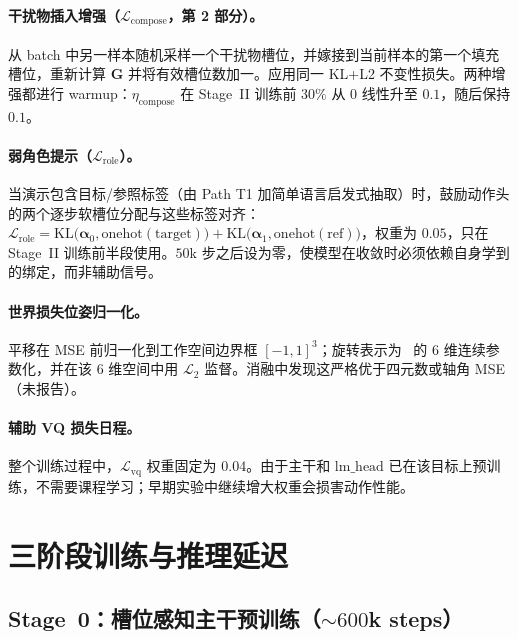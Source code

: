 \paragraph{干扰物插入增强（$\mathcal{L}_\mathrm{compose}$，第 2 部分）。}
从 batch 中另一样本随机采样一个干扰物槽位，并嫁接到当前样本的第一个填充槽位，重新计算 $\mathbf{G}$ 并将有效槽位数加一。应用同一 KL+L2 不变性损失。两种增强都进行 warmup：$\eta_\mathrm{compose}$ 在 Stage~II 训练前 $30\%$ 从 $0$ 线性升至 $0.1$，随后保持 $0.1$。

\paragraph{弱角色提示（$\mathcal{L}_\mathrm{role}$）。}
当演示包含目标/参照标签（由 Path T1 加简单语言启发式抽取）时，鼓励动作头的两个逐步软槽位分配与这些标签对齐：$\mathcal{L}_\mathrm{role}=\mathrm{KL}\bigl(\boldsymbol{\alpha}_0,\mathrm{onehot}(\text{target})\bigr)+\mathrm{KL}\bigl(\boldsymbol{\alpha}_1,\mathrm{onehot}(\text{ref})\bigr)$，权重为 $0.05$，只在 Stage~II 训练前半段使用。$50$k 步之后设为零，使模型在收敛时必须依赖自身学到的绑定，而非辅助信号。

\paragraph{世界损失位姿归一化。}
平移在 MSE 前归一化到工作空间边界框 $[-1,1]^3$；旋转表示为~\citep{zhou2019continuity} 的 $6$ 维连续参数化，并在该 $6$ 维空间中用 $\mathcal{L}_2$ 监督。消融中发现这严格优于四元数或轴角 MSE（未报告）。

\paragraph{辅助 VQ 损失日程。}
整个训练过程中，$\mathcal{L}_\mathrm{vq}$ 权重固定为 $0.04$。由于主干和 $\mathrm{lm\_head}$ 已在该目标上预训练，不需要课程学习；早期实验中继续增大权重会损害动作性能。

\section{三阶段训练与推理延迟}
\label{app:training-detail}
\label{app:repro}
\label{app:latency}

\subsection*{Stage~0：槽位感知主干预训练（$\sim\!600$k steps）}


